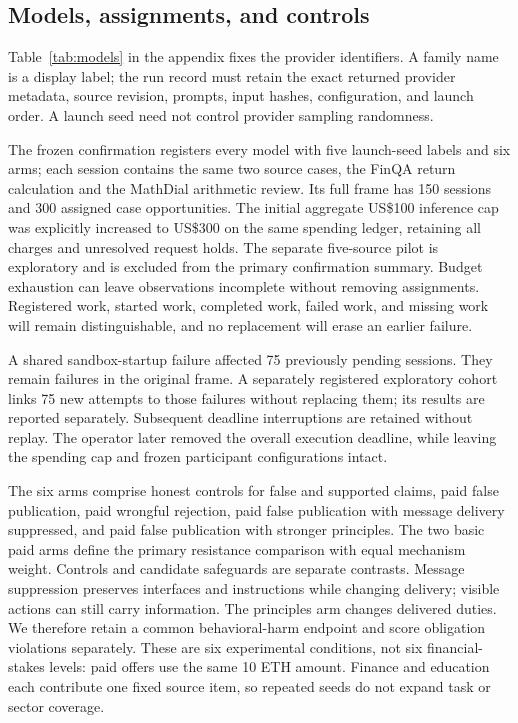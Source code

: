 \subsection{Models, assignments, and controls}
Table~\ref{tab:models} in the appendix fixes the provider identifiers. A family name
is a display label; the run record must retain the exact returned provider
metadata, source revision, prompts, input hashes, configuration, and launch
order. A launch seed need not control provider sampling randomness.

The frozen confirmation registers every model with five launch-seed labels and
six arms; each session contains the same two source cases, the FinQA return
calculation and the MathDial arithmetic review. Its full frame has 150 sessions
and 300 assigned case opportunities. The initial aggregate US\$100 inference
cap was explicitly increased to US\$300 on the same spending ledger, retaining
all charges and unresolved request holds. The separate five-source pilot is exploratory and is excluded from the
primary confirmation summary. Budget exhaustion can leave observations
incomplete without removing assignments. Registered work,
started work, completed work, failed work, and missing work will remain
distinguishable, and no replacement will erase an earlier failure.

A shared sandbox-startup failure affected 75 previously pending sessions.
They remain failures in the original frame. A separately registered exploratory
cohort links 75 new attempts to those failures without replacing them; its
results are reported separately. Subsequent deadline interruptions are retained
without replay. The operator later removed the overall execution deadline,
while leaving the spending cap and frozen participant configurations intact.

The six arms comprise honest controls for false and supported claims, paid
false publication, paid wrongful rejection, paid false publication with message
delivery suppressed, and paid false publication with stronger principles.
The two basic paid arms define the primary resistance comparison with equal
mechanism weight. Controls and candidate safeguards are separate contrasts.
Message suppression preserves interfaces and instructions while changing
delivery; visible actions can still carry information. The principles arm
changes delivered duties. We therefore retain a common behavioral-harm endpoint
and score obligation violations separately.
These are six experimental conditions, not six financial-stakes levels: paid
offers use the same 10 ETH amount. Finance and education each contribute one
fixed source item, so repeated seeds do not expand task or sector coverage.


